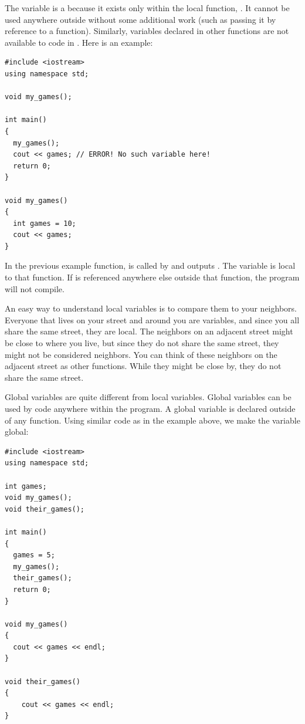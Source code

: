 The variable  is a  because it exists only within the local function, . 
It cannot be used anywhere outside  without some additional work (such as passing it by reference to a function). 
Similarly, variables declared in other functions are not available to code in . 
Here is an example: \nopagebreak[4]

\noindent\begin{minipage}{\linewidth}\begin{lstlisting}
#include <iostream>
using namespace std;
	
void my_games();

int main()
{
  my_games();
  cout << games; // ERROR! No such variable here!
  return 0;
}

void my_games()
{
  int games = 10;
  cout << games;
}
\end{lstlisting}\end{minipage}

In the previous example function,  is called by  and outputs .
The variable  is local to that function. 
If  is referenced anywhere else outside that function, the program will not compile.

An easy way to understand local variables is to compare them to your neighbors. 
Everyone that lives on your street and around you are variables, and since you all share the same street, they are local. 
The neighbors on an adjacent street might be close to where you live, but since they do not share the same street, they might not be considered neighbors. 
You can think of these neighbors on the adjacent street as other functions. 
While they might be close by, they do not share the same street.

Global variables are quite different from local variables. 
Global variables can be used by code anywhere within the program. 
A global variable is declared outside of any function. 
Using similar code as in the example above, we make the  variable global: \nopagebreak[4]

\noindent\begin{minipage}{\linewidth}\begin{lstlisting}
#include <iostream>
using namespace std;

int games;
void my_games();
void their_games();

int main()
{
  games = 5;
  my_games();
  their_games();
  return 0;
}

void my_games()
{
  cout << games << endl;
}

void their_games()
{
	cout << games << endl;
}
\end{lstlisting}\end{minipage}

